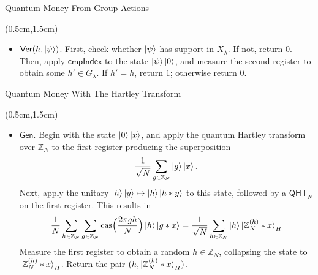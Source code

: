 \documentclass{beamer}
\theoremstyle{definition}
\newcommand{\cas}{\mathrm{cas}}
\newcommand{\qht}{\mathsf{QHT}}
\newcommand{\comph}{\mathsf{cmpIndex}}
\newcommand{\gen}{\mathsf{Gen}}
\newcommand{\ver}{\mathsf{Ver}}
\begin{document}
\begin{frame}{Quantum Money From Group Actions}
    
    \begin{textblock*}{12cm}(0.5cm,1.5cm)
            
        
        \begin{itemize}
        \item $\ver(h, \ket{\psi})$. First, check whether $\ket{\psi}$ has support in $X_\lambda$. If not, return $0$. Then, apply $\comph$ to the state $\ket{\psi}\ket{0}$, and measure the second register to obtain some $h' \in G_\lambda$. If $h' = h$, return $1$; otherwise return $0$.
        \end{itemize}

        
    \end{textblock*}


\end{frame}




\begin{frame}{Quantum Money With The Hartley Transform}
    
    \begin{textblock*}{12cm}(0.5cm,1.5cm)
            
        
       
        \begin{itemize}
            \item $\gen$. Begin with the state $\ket{0}\ket{x}$, and apply the quantum Hartley transform over $\mathbb{Z}_N$ to the first register producing the superposition
            \[ \frac{1}{\sqrt{N}} \sum_{g \in \mathbb{Z}_N} \ket{g}\ket{x}. \]
            Next, apply the unitary $\ket{h}\ket{y} \mapsto \ket{h}\ket{h * y}$ to this state, followed by a $\qht_N$ on the first register. This results in
            \[ \frac{1}{N} \sum_{h \in \mathbb{Z}_N} \sum_{g \in \mathbb{Z}_N} \cas\Big(\frac{2\pi gh}{N}\Big) \ket{h}\ket{g * x} = \frac{1}{\sqrt{N}} \sum_{h \in \mathbb{Z}_N} \ket{h} \ket{\mathbb{Z}_N^{(h)} * x}_H \]
            Measure the first register to obtain a random $h \in \mathbb{Z}_N$, collapsing the state to $\ket{\mathbb{Z}_N^{(h)} * x}_H$. Return the pair $(h, \ket{\mathbb{Z}_N^{(h)} * x}_H)$.

        \end{itemize}
        
       
        
    \end{textblock*}


\end{frame}
\end{document}
